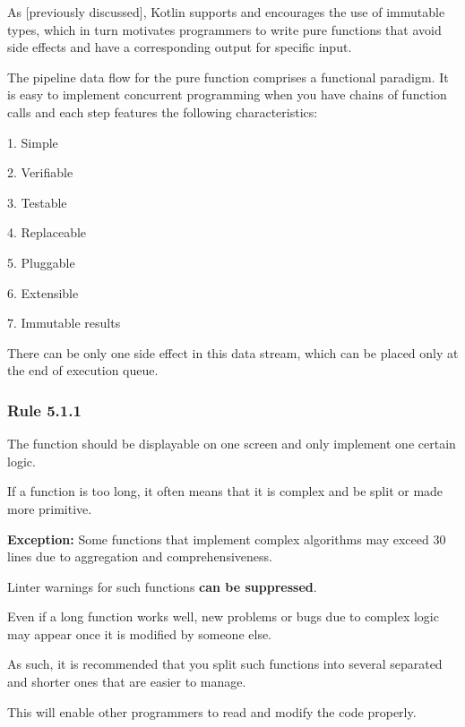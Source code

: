{{{{As [previously discussed], Kotlin supports and encourages the use of immutable types, which in turn motivates programmers to write pure functions that avoid side effects and have a corresponding output for specific input. 

The pipeline data flow for the pure function comprises a functional paradigm. It is easy to implement concurrent programming when you have chains of function calls and each step features the following characteristics:

1.	Simple

2.	Verifiable

3.	Testable

4.	Replaceable

5.	Pluggable

6.	Extensible

7.	Immutable results



There can be only one side effect in this data stream, which can be placed only at the end of execution queue.



\subsubsection*{\textbf{Rule 5.1.1}}
\leavevmode\newline



The function should be displayable on one screen and only implement one certain logic.

If a function is too long, it often means that it is complex and be split or made more primitive.



\textbf{Exception:} Some functions that implement complex algorithms may exceed 30 lines due to aggregation and comprehensiveness.

Linter warnings for such functions \textbf{can be suppressed}. 



Even if a long function works well, new problems or bugs due to complex logic may appear once it is modified by someone else.

As such, it is recommended that you split such functions into several separated and shorter ones that are easier to manage.

This will enable other programmers to read and modify the code properly.



}}}}
